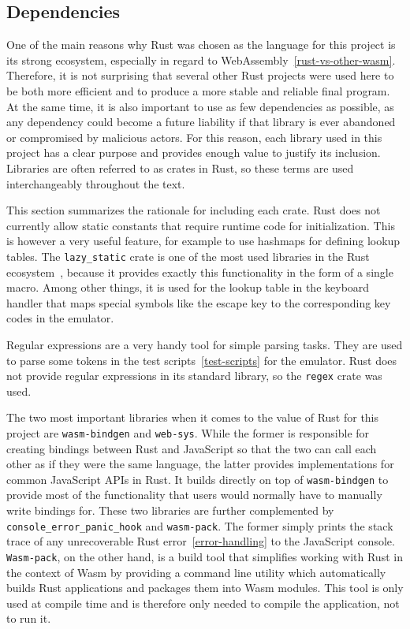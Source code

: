 \subsection{Dependencies}
\label{rust-deps}
One of the main reasons why Rust was chosen as the language for this project is its strong ecosystem, especially in regard to WebAssembly~\ref{rust-vs-other-wasm}.
Therefore, it is not surprising that several other Rust projects were used here to be both more efficient and to produce a more stable and reliable final program.
At the same time, it is also important to use as few dependencies as possible, as any dependency could become a future liability if that library is ever abandoned or compromised by malicious actors.
For this reason, each library used in this project has a clear purpose and provides enough value to justify its inclusion. Libraries are often referred to as crates in Rust, so these terms are used interchangeably throughout the text.

This section summarizes the rationale for including each crate.
Rust does not currently allow static constants that require runtime code for initialization.
This is however a very useful feature, for example to use hashmaps for defining lookup tables.
The \verb+lazy_static+ crate is one of the most used libraries in the Rust ecosystem~\cite[Downloads all time]{lazystatic}, because it provides exactly this functionality in the form of a single macro.
Among other things, it is used for the lookup table in the keyboard handler that maps special symbols like the escape key to the corresponding key codes in the emulator.

Regular expressions are a very handy tool for simple parsing tasks. They are used to parse some tokens in the test scripts~\ref{test-scripts} for the emulator. Rust does not provide regular expressions in its standard library, so the \verb+regex+ crate was used.

\label{web-sys}
The two most important libraries when it comes to the value of Rust for this project are \verb+wasm-bindgen+ and \verb+web-sys+.
While the former is responsible for creating bindings between Rust and JavaScript so that the two can call each other as if they were the same language, the latter provides implementations for common JavaScript APIs in Rust.
It builds directly on top of \verb+wasm-bindgen+ to provide most of the functionality that users would normally have to manually write bindings for.
These two libraries are further complemented by \verb+console_error_panic_hook+ and \verb+wasm-pack+.
The former simply prints the stack trace of any unrecoverable Rust error~\ref{error-handling} to the JavaScript console.
\verb+Wasm-pack+, on the other hand, is a build tool that simplifies working with Rust in the context of Wasm by providing a command line utility which automatically builds Rust applications and packages them into Wasm modules.
This tool is only used at compile time and is therefore only needed to compile the application, not to run it.

